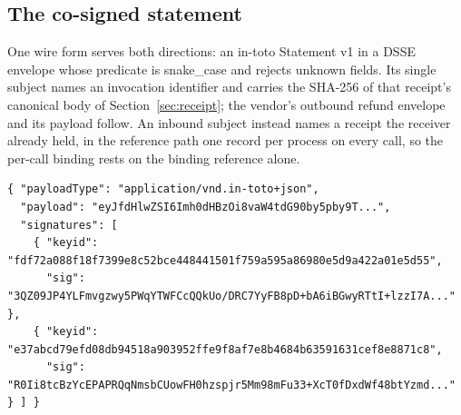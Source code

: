 \subsection{The co-signed statement}

One wire form serves both directions: an in-toto Statement v1 \cite{intoto} in
a DSSE envelope \cite{dsse} whose predicate is snake\_case and rejects unknown
fields. Its single subject names an invocation identifier and carries the
SHA-256 of that receipt's canonical body of Section~\ref{sec:receipt}; the
vendor's outbound refund envelope and its payload follow.
An inbound subject instead names a receipt the receiver already held, in the
reference path one record per process on every call, so the per-call binding
rests on the binding reference alone.
\begin{lstlisting}
{ "payloadType": "application/vnd.in-toto+json",
  "payload": "eyJfdHlwZSI6Imh0dHBzOi8vaW4tdG90by5pby9T...",
  "signatures": [
    { "keyid": "fdf72a088f18f7399e8c52bce448441501f759a595a86980e5d9a422a01e5d55",
      "sig": "3QZ09JP4YLFmvgzwy5PWqYTWFCcQQkUo/DRC7YyFB8pD+bA6iBGwyRTtI+lzzI7A..." },
    { "keyid": "e37abcd79efd08db94518a903952ffe9f8af7e8b4684b63591631cef8e8871c8",
      "sig": "R0Ii8tcBzYcEPAPRQqNmsbCUowFH0hzspjr5Mm98mFu33+XcT0fDxdWf48btYzmd..." } ] }
\end{lstlisting}

